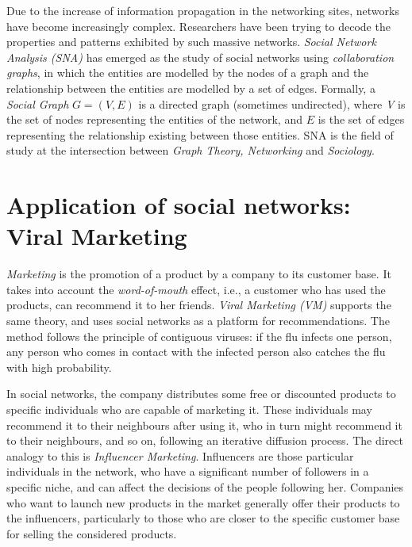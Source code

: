 Due to the increase of information propagation in the networking sites, networks have become increasingly complex. Researchers have been trying to decode the properties and patterns exhibited by such massive networks. \emph{Social Network Analysis (SNA)} has emerged as the study of social networks using \emph{collaboration graphs}, in which the entities are modelled by the nodes of a graph and the relationship between the entities are modelled by a set of edges. Formally, a \emph{Social Graph} $G = (V, E)$ is a directed graph (sometimes undirected), where \emph{V} is the set of nodes representing the entities of the network, and $E$ is the set of edges  representing the relationship existing between those entities. SNA is the field of study at the intersection between \emph{Graph Theory, Networking} and \emph{Sociology}.



\section{Application of social networks: Viral Marketing}

\emph{Marketing} is the promotion of a product by a company to its customer base. It takes into account the \emph{word-of-mouth} effect, i.e., a customer who has used the products, can recommend it to her friends. \emph{Viral Marketing (VM)} supports the same theory, and uses social networks as a platform for recommendations. The method follows the principle of contiguous viruses: if the flu infects one person, any person who comes in contact with the infected person also catches the flu with high probability.

In social networks, the company distributes some free or discounted products to specific individuals who are capable of marketing it. These individuals may recommend it to their neighbours after using it, who in turn might recommend it to their neighbours, and so on, following an iterative diffusion process. The direct analogy to this is \emph{Influencer Marketing}. Influencers are those particular individuals in the network, who have a significant number of followers in a specific niche, and can affect the decisions of the people following her. Companies who want to launch new products in the market generally offer their products to the influencers, particularly to those who are closer to the specific customer base for selling the considered products. 

